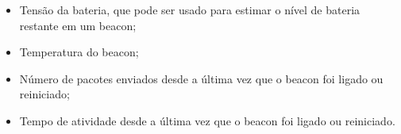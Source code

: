 \begin{itemize}
	\item Tensão da bateria, que pode ser usado para estimar o nível de bateria restante em um beacon;
	\item Temperatura do beacon;
	\item Número de pacotes enviados desde a última vez que o beacon foi ligado ou reiniciado;
	\item Tempo de atividade desde a última vez que o beacon foi ligado ou reiniciado.
\end{itemize}